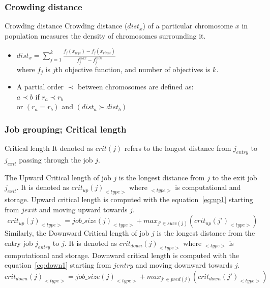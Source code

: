 \documentclass{beamer}
\begin{document}
\begin{frame}[label=crwd]
 \frametitle{Crowding distance}
\begin{block}
 {Crowding distance} Crowding distance ($dist_x$) of a particular chromosome $x$ in population measures the density of chromosomes surrounding it. \\
\end{block}
\begin{itemize}
\item $dist_x = \sum _{j=1}^{k}\frac{f_j(x_{left})-f_j(x_{right})}{f_j^{max} -f_j^{min}}$\\
where $f_j$ is $j$th objective function, and number of objectives is $k$.
\item A partial order $\prec$ between chromosomes are defined as:\\
$ a \prec b $ if $r_a \prec r_b$\\
or $(r_a = r_b)$ and $(dist_a \succ dist_b)$ \hyperlink{chromosomemod}{}
\end{itemize}
\end{frame}

\begin{frame}[label=jbgrpeq]
\frametitle{Job grouping; Critical length}
\begin{block}
{Critical length} It denoted as $crit(j)$ refers to the longest distance from $j_{entry}$ to $j_{exit}$ passing through the job $j$. 
\end{block}
{\tiny
The Upward Critical length of job $j$ is the longest distance from $j$ to the exit job $j_{exit}$. It is denoted as $crit_{up}(j)_{<type>}$ where $_{<type>}$ is computational and storage. Upward critical length is computed with the equation~\ref{eq:up1} starting from $j{exit}$ and moving upward towards $j$.
\begin{equation}\label{eq:up1}
crit_{up}(j)_{<type>} = job\_size(j)_{<type>} + max_{j' \in succ(j)}(crit_{up}(j')_{<type>})
\end{equation}
Similarly, the Downward Critical length of job $j$ is the longest distance from the entry job $j_{entry}$ to $j$. It is denoted as $crit_{down}(j)_{<type>}$ where $_{<type>}$ is computational and storage. Downward critical length is computed with the equation~\ref{eq:down1} starting from $j{entry}$ and moving downward towards $j$.
\begin{equation}\label{eq:down1}
crit_{down}(j)_{<type>} = job\_size(j)_{<type>} + max_{j' \in pred(j)}(crit_{down}(j')_{<type>}) 
\end{equation} \hyperlink{jbgrp}{}
}
\end{frame}
\end{document}
